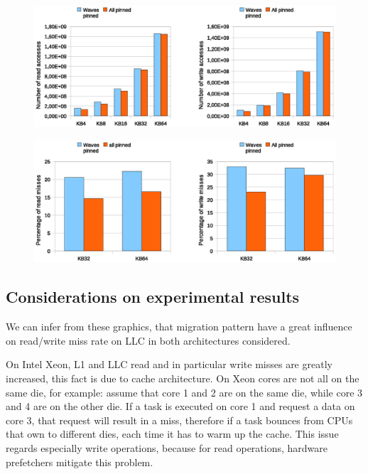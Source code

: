 \begin{figure}[htbp]
\centering
\includegraphics[width=\widefigure]{images/cpuaff/cpuaff_acc_l3_load_store_i7.eps}
\caption{}
\label{fig:cpuaff_acc_l2_load_store_i7}
\end{figure}

\begin{figure}[htbp]
\centering
\includegraphics[width=\widefigure]{images/cpuaff/cpuaff_l3_load_store_i7.eps}
\caption{}
\label{fig:cpuaff_l1_load_i7}
\end{figure}

\newpage
\subsection{Considerations on experimental results}

We can infer from these graphics, that migration pattern have a great influence on read/write miss rate on LLC in both architectures considered. 

On Intel Xeon, L1 and LLC read and in particular write misses are greatly increased, this fact is due to cache architecture. On Xeon cores are not all on 
the same die, for example: assume that core 1 and 2 are on the same die, while core 3 and 4 are on the other die. If a task is executed on core 1 and 
request a data on core 3, that request will result in a miss, therefore if a task bounces from CPUs that own to different dies, each time it has to warm 
up the cache. This issue regards especially write operations, because for read operations, hardware prefetchers mitigate this problem.

